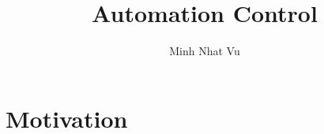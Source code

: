 \documentclass[a4paper]{article}
\title{Automation Control}
\author{Minh Nhat Vu}
\begin{document}
\maketitle
\section{Motivation}
\cite{baillieul1985kinematic}


\end{document}
